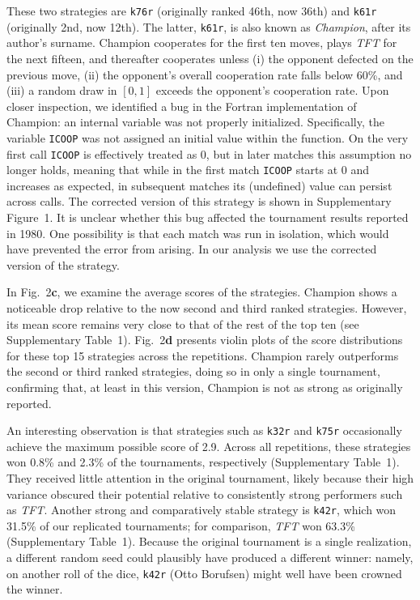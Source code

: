 \documentclass{article}
\newcommand{\TFT}{\emph{TFT}}
\begin{document}
These two strategies are \texttt{k76r} (originally ranked 46th, now 36th) and
\texttt{k61r} (originally 2nd, now 12th). The latter, \texttt{k61r}, is also
known as \emph{Champion}, after its author's surname. Champion cooperates for the
first ten moves, plays \TFT{} for the next fifteen, and thereafter cooperates
unless (i) the opponent defected on the previous move, (ii) the opponent's
overall cooperation rate falls below 60\%, and (iii) a random draw in $[0,1]$
exceeds the opponent's cooperation rate.
Upon closer inspection, we identified a bug in the Fortran implementation of
Champion: an internal variable was not properly initialized. Specifically, the
variable \texttt{ICOOP} was not assigned an initial value within the function. On the very
first call \texttt{ICOOP} is effectively treated as $0$, but in later matches this
assumption no longer holds, meaning that while in the first match \texttt{ICOOP}
starts at $0$ and increases as expected, in subsequent matches its (undefined)
value can persist across calls. The corrected version of this strategy is shown in
Supplementary Figure~1. It is unclear whether this bug affected the tournament
results reported in 1980. One possibility is that each match was run in isolation,
which would have prevented the error from arising. In our analysis we use the
corrected version of the strategy.

In Fig.~2\textbf{c}, we examine the average scores of the
strategies. Champion shows a noticeable drop relative to the now
second and third ranked strategies. However, its mean score remains very close to that
of the rest of the top ten (see Supplementary Table~1).
Fig.~2\textbf{d} presents violin plots of the
score distributions for these top 15 strategies across the
 repetitions. Champion
rarely outperforms the second or third ranked strategies, doing so in only a
single tournament, confirming that, at least in this version, Champion
is not as strong as originally reported.

An interesting observation is that strategies such as \texttt{k32r} and
\texttt{k75r} occasionally achieve the maximum possible score of 2.9. Across all
repetitions, these strategies won 0.8\% and 2.3\% of the tournaments,
respectively (Supplementary Table~1).
They received little attention in the original tournament, likely because their
high variance obscured their potential relative to consistently strong
performers such as \TFT{}. Another strong and comparatively stable strategy is
\texttt{k42r}, which won 31.5\% of our replicated tournaments; for comparison,
\TFT{} won 63.3\% (Supplementary Table~1).
Because the original tournament is a single realization, a different random seed
could plausibly have produced a different winner: namely, on another roll of the
dice, \texttt{k42r} (Otto Borufsen) might well have been crowned the winner.
\end{document}
